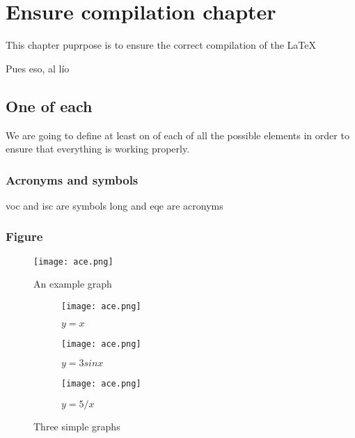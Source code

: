 \chapter{Ensure compilation chapter}\label{ch:Compilation}
\begin{chapter_resume}
This chapter puprpose is to ensure the correct compilation of the \LaTeX
\vspace{0.7cm}

Pues eso, al lío
\end{chapter_resume}


\section{One of each}
We are going to define at least on of each of all the possible elements in order to ensure that everything is working properly.


\subsection{Acronyms and symbols}
\gls{voc} and \gls{isc} are symbols
\gls{long} and \gls{eqe} are acronyms


\subsection{Figure}

\begin{figure}[ht]
\centering
\texttt{[image: ace.png]}
\caption{An example graph}
\label{fig:F0X_cubedgraph}
\end{figure}

\begin{figure}
    \centering
    \begin{subfigure}[b]{0.3\textwidth}
        \centering
        \texttt{[image: ace.png]}
        \caption{$y=x$}
        \label{fig:F0X_threegraphs_A}
    \end{subfigure}
    \hfill
    \begin{subfigure}[b]{0.3\textwidth}
        \centering
        \texttt{[image: ace.png]}
        \caption{$y=3sinx$}
        \label{fig:F0X_threegraphs_B}
    \end{subfigure}
    \hfill
    \begin{subfigure}[b]{0.3\textwidth}
        \centering
        \texttt{[image: ace.png]}
        \caption{$y=5/x$}
        \label{fig:F0X_threegraphs_C}
    \end{subfigure}
    \caption{Three simple graphs}
    \label{fig:F0X_threegraphs}
\end{figure}

